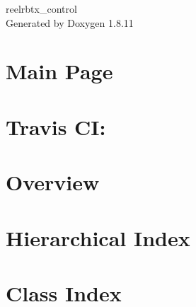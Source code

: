 \documentclass[twoside]{book}
\newcommand{\+}{\discretionary{\mbox{\scriptsize$\hookleftarrow$}}{}{}}
\newcommand{\clearemptydoublepage}{%
  \newpage{\pagestyle{empty}\cleardoublepage}%
}
\begin{document}
\hypersetup{pageanchor=false,
             bookmarksnumbered=true,
             pdfencoding=unicode
            }
\begin{titlepage}
\vspace*{7cm}
\begin{center}%
{\Large reelrbtx\+\_\+control }\\
\vspace*{1cm}
{\large Generated by Doxygen 1.8.11}\\
\end{center}
\end{titlepage}
\clearemptydoublepage
\tableofcontents
\clearemptydoublepage
{}
\hypersetup{pageanchor=true}

\chapter{Main Page}
\label{index}\hypertarget{index}{}
\chapter{Travis CI\+:}
\label{md_README}
\hypertarget{md_README}{}

\chapter{Overview}
\label{md_rosdoc_lite_README}
\hypertarget{md_rosdoc_lite_README}{}

\chapter{Hierarchical Index}

\chapter{Class Index}

\end{document}
